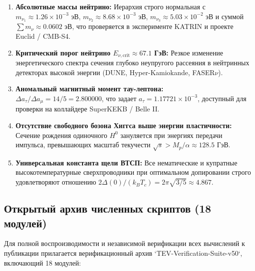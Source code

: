 \documentclass[12pt,a4paper]{article}
\theoremstyle{definition}
\theoremstyle{remark}
\begin{document}
\begin{enumerate}
	\item \textbf{Абсолютные массы нейтрино:} Иерархия строго нормальная с $m_{\nu_1} \approx 1.26 \times 10^{-3}$ эВ, $m_{\nu_2} \approx 8.68 \times 10^{-3}$ эВ, $m_{\nu_3} \approx 5.03 \times 10^{-2}$ эВ и суммой $\sum m_\nu \approx 0.0602$ эВ, что проверяется в эксперименте KATRIN и проекте Euclid / CMB-S4.
	\item \textbf{Критический порог нейтрино $E_{\nu, \mathrm{crit}} \approx 67.1$ ГэВ:} Резкое изменение энергетического спектра сечения глубоко неупругого рассеяния в нейтринных детекторах высокой энергии (DUNE, Hyper-Kamiokande, FASER$\nu$).
	\item \textbf{Аномальный магнитный момент тау-лептона:} $\Delta a_\tau / \Delta a_\mu = 14/5 = 2.800000$, что задает $a_\tau = 1.17721 \times 10^{-3}$, доступный для проверки на коллайдере SuperKEKB / Belle II.
	\item \textbf{Отсутствие свободного бозона Хиггса выше энергии пластичности:} Сечение рождения одиночного $H^0$ зануляется при энергиях передачи импульса, превышающих масштаб текучести $\sqrt{s} > M_p / \alpha \approx 128.5$ ГэВ.
	\item \textbf{Универсальная константа щели ВТСП:} Все нематические и купратные высокотемпературные сверхпроводники при оптимальном допировании строго удовлетворяют отношению $2\Delta(0)/(k_B T_c) = 2\pi\sqrt{3/5} \approx 4.867$.
\end{enumerate}

\subsection{Открытый архив численных скриптов (18 модулей)}
Для полной воспроизводимости и независимой верификации всех вычислений к публикации прилагается верификационный архив `TEV-Verification-Suite-v50`, включающий 18 модулей:
\end{document}
